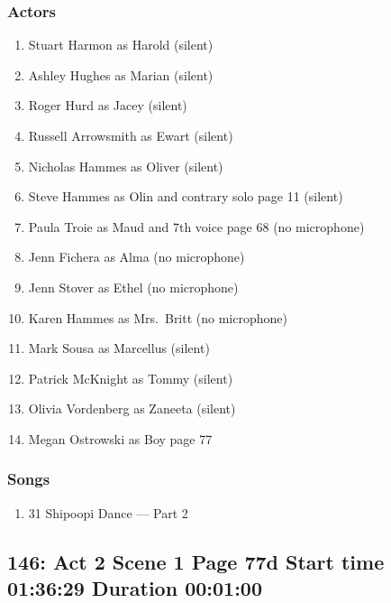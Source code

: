 \subsubsection{Actors}
\begin{enumerate}
\item Stuart Harmon as Harold (silent)
\item Ashley Hughes as Marian (silent)
\item Roger Hurd as Jacey (silent)
\item Russell Arrowsmith as Ewart (silent)
\item Nicholas Hammes as Oliver (silent)
\item Steve Hammes as Olin and contrary solo page 11 (silent)
\item Paula Troie as Maud and 7th voice page 68 (no microphone)
\item Jenn Fichera as Alma (no microphone)
\item Jenn Stover as Ethel (no microphone)
\item Karen Hammes as Mrs.~Britt (no microphone)
\item Mark Sousa as Marcellus (silent)
\item Patrick McKnight as Tommy (silent)
\item Olivia Vordenberg as Zaneeta (silent)
\item Megan Ostrowski as Boy page 77
\end{enumerate}

\subsubsection{Songs}
\begin{enumerate}
\item 31 Shipoopi Dance --- Part 2
\end{enumerate}
\subsection{146: Act 2 Scene 1 Page 77d Start time 01:36:29 Duration 00:01:00}

